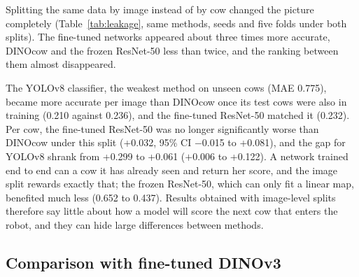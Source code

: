 \begin{cambio}
Splitting the same data by image instead of by cow changed the picture completely (Table~\ref{tab:leakage}, same methods, seeds and five folds under both splits).
The fine-tuned networks appeared about three times more accurate, DINOcow and the frozen ResNet-50 less than twice, and the ranking between them almost disappeared.
\end{cambio}

\begin{table}[!htbp]
  \centering
  \caption{Effect of identity leakage, with the same methods split by cow or by image.}
  \label{tab:leakage}
\end{table}

\begin{cambio}
The YOLOv8 classifier, the weakest method on unseen cows (MAE 0.775), became more accurate per image than DINOcow once its test cows were also in training (0.210 against 0.236), and the fine-tuned ResNet-50 matched it (0.232).
Per cow, the fine-tuned ResNet-50 was no longer significantly worse than DINOcow under this split (+0.032, 95\% CI $-$0.015 to +0.081), and the gap for YOLOv8 shrank from +0.299 to +0.061 ($+$0.006 to +0.122).
A network trained end to end can  a cow it has already seen and return her score, and the image split rewards exactly that; the frozen ResNet-50, which can only fit a linear map, benefited much less (0.652 to 0.437).
Results obtained with image-level splits therefore say little about how a model will score the next cow that enters the robot, and they can hide large differences between methods.
\end{cambio}

\subsection{Comparison with fine-tuned DINOv3}
\label{sec:res-lora}

